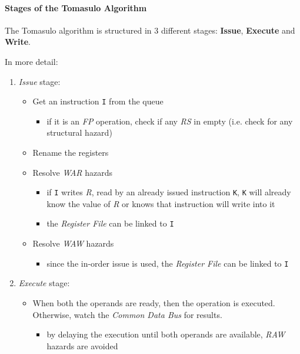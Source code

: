 \documentclass[english]{article}
\begin{document}
\paragraph{Stages of the Tomasulo Algorithm}

The Tomasulo algorithm is structured in \(3\) different stages: \textbf{Issue}, \textbf{Execute} and \textbf{Write}.

\bigskip
In more detail:

\begin{enumerate}
  \item \textit{Issue} stage:
        \begin{itemize}
          \item Get an instruction \texttt{I} from the queue
                \begin{itemize}
                  \item if it is an \textit{FP} operation, check if any \textit{RS} in empty (i.e. check for any structural hazard)
                \end{itemize}
          \item Rename the registers
          \item Resolve \textit{WAR} hazards
                \begin{itemize}
                  \item if \texttt{I} writes \textit{R}, read by an already issued instruction \texttt{K}, \texttt{K} will already know the value of \textit{R} or knows that instruction will write into it
                  \item the \textit{Register File} can be linked to \texttt{I}
                \end{itemize}
          \item Resolve \textit{WAW} hazards
                \begin{itemize}
                  \item since the in-order issue is used, the \textit{Register File} can be linked to \texttt{I}
                \end{itemize}
        \end{itemize}
  \item \textit{Execute} stage:
        \begin{itemize}
          \item When both the operands are ready, then the operation is executed. Otherwise, watch the \textit{Common Data Bus} for results.
                \begin{itemize}
                  \item by delaying the execution until both operands are available, \textit{RAW} hazards are avoided

\end{itemize}
\end{itemize}
\end{enumerate}
\end{document}

